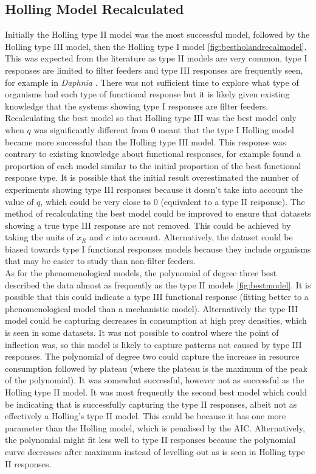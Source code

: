 \documentclass{article}
\begin{document}
\subsection{Holling Model Recalculated}
Initially the Holling type II model was the most successful model, followed by the Holling type III model, then the Holling type I model \ref{fig:bestholandrecalmodel}. This was expected from the literature as type II models are very common, type I responses are limited to filter feeders \cite{Jeschke2004Consumer-foodFeeders} and type III responses are frequently seen, for example in \textit{Daphnia} \cite{Sarnelle2008TypeDaphnia}. There was not sufficient time to explore what type of organisms had each type of functional response but it is likely given existing knowledge that the systems showing type I responses are filter feeders. Recalculating the best model so that Holling type III was the best model only when $q$ was significantly different from $0$ meant that the type I Holling model became more successful than the Holling type III model. This response was contrary to existing knowledge about functional responses, for example \cite{Dunn2020PredatorHabitats} found a proportion of each model similar to the initial proportion of the best functional response type. It is possible that the initial result overestimated the number of experiments showing type III responses because it doesn't take into account the value of $q$, which could be very close to $0$ (equivalent to a type II response). The method of recalculating the best model could be improved to ensure that datasets showing a true type III response are not removed. This could be achieved by taking the units of $x_R$ and $c$ into account. Alternatively, the dataset could be biased towards type I functional responses models because they include organisms that may be easier to study than non-filter feeders\cite{Jeschke2004Consumer-foodFeeders}.
\\
As for the phenomenological models, the polynomial of degree three best described the data almost as frequently as the type II models \ref{fig:bestmodel}. It is possible that this could indicate a type III functional response (fitting better to a phenomenological model than a mechanistic model). Alternatively the type III model could be capturing decreases in consumption at high prey densities, which is seen in some datasets. It was not possible to control where the point of inflection was, so this model is likely to capture patterns not caused by type III responses. The polynomial of degree two could capture the increase in resource consumption followed by plateau (where the plateau is the maximum of the peak of the polynomial). It was somewhat successful, however not as successful as the Holling type II model. It was most frequently the second best model which could be indicating that is successfully capturing the type II responses, albeit not as effectively a Holling's type II model. This could be because it has one more parameter than the Holling model, which is penalised by the AIC. Alternatively, the polynomial might fit less well to type II responses because the polynomial curve decreases after maximum instead of levelling out as is seen in Holling type II responses. 
\end{document}
